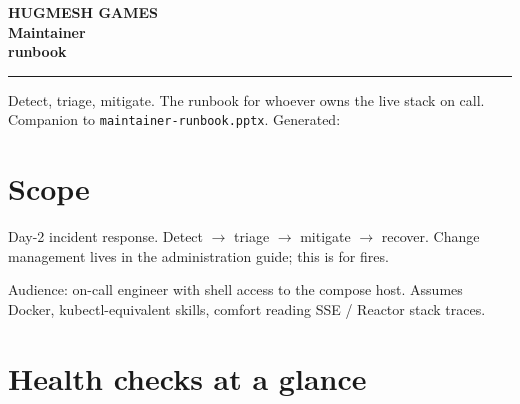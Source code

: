 \documentclass[11pt,a4paper,openany]{book}
\begin{document}
\begin{titlepage}\thispagestyle{empty}
\noindent{}
\vspace*{4cm}\noindent
{\sffamily\bfseries
  {\color{snapAccentTwo}\fontsize{18}{22}\selectfont HUGMESH GAMES}\\[3mm]
  {\color{white}\fontsize{42}{50}\selectfont Maintainer\\runbook}\par}
\vspace{1.5cm}\noindent\color{white!75!snapAccentTwo}\rule{0.4\linewidth}{1.2pt}
\vspace{0.8cm}\noindent
{\sffamily\color{white!85}\large
Detect, triage, mitigate. The runbook for whoever owns the live stack
on call.}
\vfill\noindent
{\sffamily\color{white!70}\small
Companion to \texttt{maintainer-runbook.pptx}. Generated: \snapbuilddate{} \snapbuildtime}
\end{titlepage}

\frontmatter\pagestyle{empty}\tableofcontents\clearpage
\mainmatter\pagestyle{fancy}

\chapter{Scope}
Day-2 incident response. Detect $\rightarrow$ triage $\rightarrow$
mitigate $\rightarrow$ recover. Change management lives in the
administration guide; this is for fires.

Audience: on-call engineer with shell access to the compose host.
Assumes Docker, kubectl-equivalent skills, comfort reading
SSE / Reactor stack traces.

\chapter{Health checks at a glance}
\end{document}
